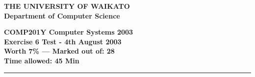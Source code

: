 \documentclass[a4paper,10pt]{article}
\begin{document}
\newcommand{\marks}[1]
{\begin{flushright}{\bf (#1 marks)}\end{flushright}}

{\centering \large \bf THE UNIVERSITY OF WAIKATO\\}
{\centering \large \bf Department of Computer Science\\[0.5cm]}

{\centering \large \bf COMP201Y Computer Systems 2003\\}
{\centering \large \bf Exercise 6 Test - 4th August 2003\\[0.3cm]}
{\centering \bf Worth 7\% --- Marked out of: 28\\[0.3cm]}
{\centering \bf Time allowed: 45 Min\\[1cm]}
\hrule
\end{document}
